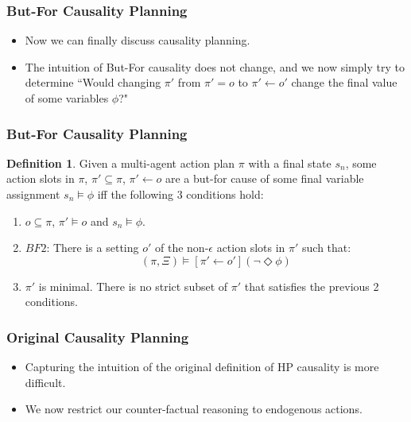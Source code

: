 \documentclass{beamer}
\theoremstyle{plain}
\theoremstyle{definition}
\newtheorem{defn}[thm]{Definition} %
\begin{document}
\begin{frame}
\frametitle{But-For Causality Planning}
\begin{itemize}
\item Now we can finally discuss causality planning.
\item The intuition of But-For causality does not change, and we now simply try to determine ``Would changing $\pi'$ from $\pi'=o$ to $\pi'\leftarrow o'$ change the final value of some variables $\phi$?"
\end{itemize}

\end{frame}

\begin{frame}
\frametitle{But-For Causality Planning}
\begin{defn} 

Given a multi-agent action plan $\pi$ with a final state $s_n$, some action slots in $\pi$, $\pi' \subseteq \pi$, $\pi' \leftarrow o$ are a but-for cause of some final variable assignment $s_n \models \phi$ iff the following 3 conditions hold:
\begin{enumerate}
\item  $o \subseteq \pi$, $\pi' \models o$ and $s_n \models \phi$.
\item $BF2$: There is a setting $o'$ of the non-$\epsilon$ action slots in $\pi'$ such that:
\[
(\pi, \Xi) \models [\pi' \leftarrow o'](\lnot \Diamond \phi)
\]
\item $\pi'$ is minimal. There is no strict subset of $\pi'$ that satisfies the previous 2 conditions.
\end{enumerate}


\end{defn}

\end{frame}



\begin{frame}
\frametitle{Original Causality Planning}
\begin{itemize}
\item Capturing the intuition of the original definition of HP causality is more difficult.
\item We now restrict our counter-factual reasoning to endogenous actions.
\end{itemize}

\end{frame}
\end{document}
